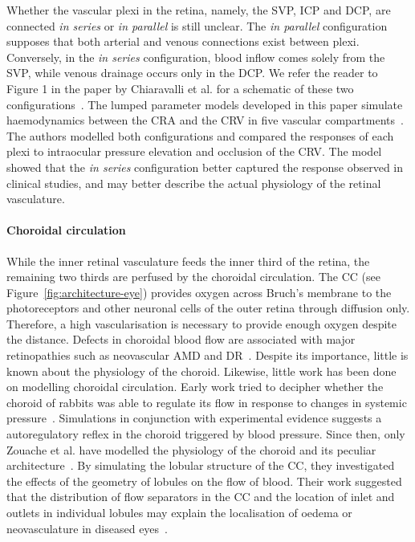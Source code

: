\documentclass{article}
\begin{document}
Whether the vascular plexi in the retina, namely, the SVP, ICP and DCP, are connected \textit{in series} or \textit{in parallel} is still unclear.
The \textit{in parallel} configuration supposes that both arterial and venous connections exist between plexi.
Conversely, in the \textit{in series} configuration, blood inflow comes solely from the SVP, while venous drainage occurs only in the DCP.
We refer the reader to Figure 1 in the paper by Chiaravalli et al. for a schematic of these two configurations~\cite{Chiaravalli_2021}.
The lumped parameter models developed in this paper simulate haemodynamics between the CRA and the CRV in five vascular compartments~\cite{Chiaravalli_2021}.
The authors modelled both configurations and compared the responses of each plexi to intraocular pressure elevation and occlusion of the CRV.
The model showed that the \textit{in series} configuration better captured the response observed in clinical studies, and may better describe the actual physiology of the retinal vasculature.

\paragraph*{Choroidal circulation}
While the inner retinal vasculature feeds the inner third of the retina, the remaining two thirds are perfused by the choroidal circulation.
The CC (see Figure~\ref{fig:architecture-eye}) provides oxygen across Bruch's membrane to the photoreceptors and other neuronal cells of the outer retina through diffusion only.
Therefore, a high vascularisation is necessary to provide enough oxygen despite the distance.
Defects in choroidal blood flow are associated with major retinopathies such as neovascular AMD and DR~\cite{Pemp_2008}.
Despite its importance, little is known about the physiology of the choroid.
Likewise, little work has been done on modelling choroidal circulation.
Early work tried to decipher whether the choroid of rabbits was able to regulate its flow in response to changes in systemic pressure~\cite{Kiel_1992}.
Simulations in conjunction with experimental evidence suggests a autoregulatory reflex in the choroid triggered by blood pressure.
Since then, only Zouache et al. have modelled the physiology of the choroid and its peculiar architecture~\cite{Zouache_2015,Zouache_2016}.
By simulating the lobular structure of the CC, they investigated the effects of the geometry of lobules on the flow of blood.
Their work suggested that the distribution of flow separators in the CC and the location of inlet and outlets in individual lobules may explain the localisation of oedema or neovasculature in diseased eyes~\cite{Zouache_2015}.
\end{document}
